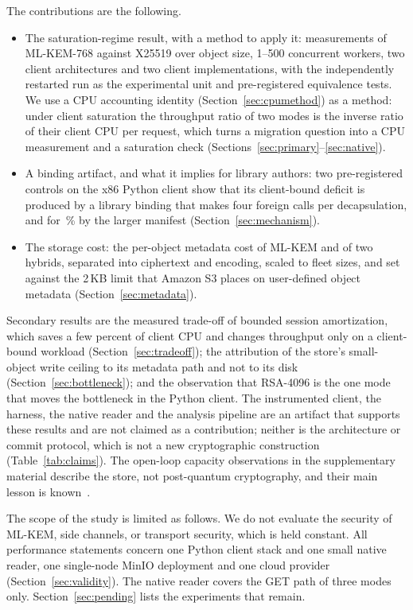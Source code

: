 \documentclass[conference]{IEEEtran}
\begin{document}
The contributions are the following.
\begin{itemize}
\item[C1] The saturation-regime result, with a method to apply it: measurements
of ML-KEM-768 against X25519 over object size, 1--500 concurrent workers, two client
architectures and two client implementations, with the independently restarted run as the
experimental unit and pre-registered equivalence tests. We use a CPU accounting identity
(Section~\ref{sec:cpumethod}) as a method: under client saturation the throughput ratio of two
modes is the inverse ratio of their client CPU per request, which turns a migration question
into a CPU measurement and a saturation check
(Sections~\ref{sec:primary}--\ref{sec:native}).
\item[C2] A binding artifact, and what it implies for library authors: two
pre-registered controls on the x86 Python client show that its client-bound deficit is produced
by a library binding that makes four foreign calls per decapsulation, and for
\AudPadShare\,\% by the larger manifest (Section~\ref{sec:mechanism}).
\item[C3] The storage cost: the per-object metadata cost of ML-KEM and of two
hybrids, separated into ciphertext and encoding, scaled to fleet sizes, and set against the
2\,KB limit that Amazon S3 places on user-defined object metadata
(Section~\ref{sec:metadata}).
\end{itemize}
Secondary results are the measured trade-off of bounded session amortization, which saves a few
percent of client CPU and changes throughput only on a client-bound workload
(Section~\ref{sec:tradeoff}); the attribution of the store's small-object write ceiling to its
metadata path and not to its disk (Section~\ref{sec:bottleneck}); and the observation that
RSA-4096 is the one mode that moves the bottleneck in the Python client. The instrumented client, the harness, the native reader and the
analysis pipeline are an artifact that supports these results and are not claimed as a
contribution; neither is the architecture or commit protocol, which is not a new cryptographic
construction (Table~\ref{tab:claims}). The open-loop capacity observations in the supplementary
material describe the store, not post-quantum cryptography, and their main lesson is
known~\cite{schroeder2006}.

The scope of the study is limited as follows. We do not evaluate the security of ML-KEM, side channels, or transport security,
which is held constant. All performance statements concern one Python client stack and one small native reader, one
single-node MinIO deployment and one cloud provider (Section~\ref{sec:validity}). The native
reader covers the GET path of three modes only. Section~\ref{sec:pending} lists the experiments
that remain.
\end{document}
